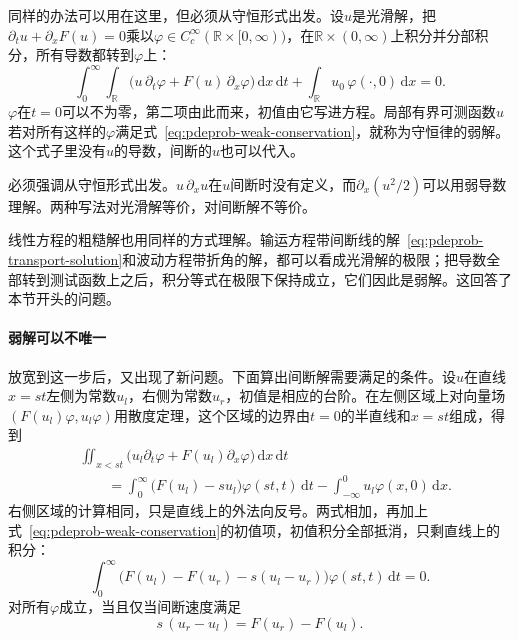 同样的办法可以用在这里，但必须从守恒形式出发。设$u$是光滑解，把$\partial_tu+\partial_xF(u)=0$乘以$\varphi\in C_c^{\infty}(\mathbb{R}\times[0,\infty))$，在$\mathbb{R}\times(0,\infty)$上积分并分部积分，所有导数都转到$\varphi$上：
\begin{equation}
  \int_0^{\infty}\!\!\int_{\mathbb{R}}\bigl(u\,\partial_t\varphi+F(u)\,\partial_x\varphi\bigr)\,\mathrm{d}x\,\mathrm{d}t
  +\int_{\mathbb{R}}u_0\,\varphi(\cdot,0)\,\mathrm{d}x=0.
  \label{eq:pdeprob-weak-conservation}
\end{equation}
$\varphi$在$t=0$可以不为零，第二项由此而来，初值由它写进方程。局部有界可测函数$u$若对所有这样的$\varphi$满足式~\eqref{eq:pdeprob-weak-conservation}，就称为守恒律的弱解。这个式子里没有$u$的导数，间断的$u$也可以代入。

必须强调从守恒形式出发。$u\,\partial_xu$在$u$间断时没有定义，而$\partial_x(u^{2}/2)$可以用弱导数理解。两种写法对光滑解等价，对间断解不等价。

线性方程的粗糙解也用同样的方式理解。输运方程带间断线的解~\eqref{eq:pdeprob-transport-solution}和波动方程带折角的解，都可以看成光滑解的极限；把导数全部转到测试函数上之后，积分等式在极限下保持成立，它们因此是弱解。这回答了本节开头的问题。

\paragraph{弱解可以不唯一}
放宽到这一步后，又出现了新问题。下面算出间断解需要满足的条件。设$u$在直线$x=st$左侧为常数$u_l$，右侧为常数$u_r$，初值是相应的台阶。在左侧区域上对向量场$(F(u_l)\varphi,u_l\varphi)$用散度定理，这个区域的边界由$t=0$的半直线和$x=st$组成，得到
\[
  \begin{aligned}
  &\iint_{x<st}\bigl(u_l\partial_t\varphi+F(u_l)\partial_x\varphi\bigr)\,\mathrm{d}x\,\mathrm{d}t\\
  &\qquad=\int_0^{\infty}\bigl(F(u_l)-su_l\bigr)\varphi(st,t)\,\mathrm{d}t
  -\int_{-\infty}^{0}u_l\varphi(x,0)\,\mathrm{d}x.
  \end{aligned}
\]
右侧区域的计算相同，只是直线上的外法向反号。两式相加，再加上式~\eqref{eq:pdeprob-weak-conservation}的初值项，初值积分全部抵消，只剩直线上的积分：
\[
  \int_0^{\infty}\bigl(F(u_l)-F(u_r)-s(u_l-u_r)\bigr)\varphi(st,t)\,\mathrm{d}t=0.
\]
对所有$\varphi$成立，当且仅当间断速度满足
\begin{equation}
  s\,(u_r-u_l)=F(u_r)-F(u_l).
  \label{eq:pdeprob-jump-condition}
\end{equation}

